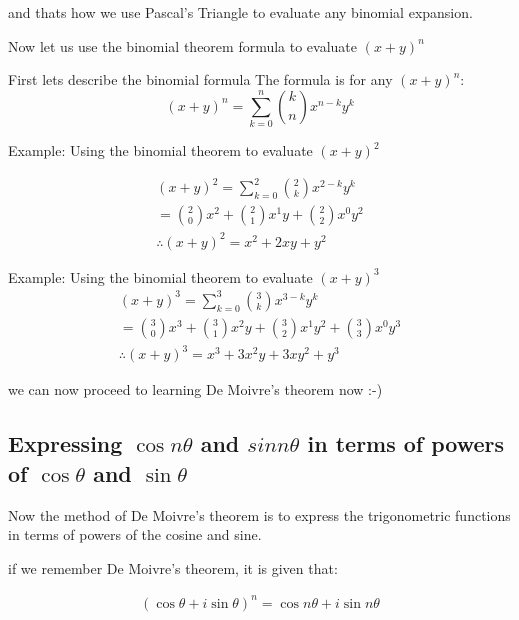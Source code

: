 and thats how we use Pascal's Triangle to evaluate any binomial expansion. \newline

Now let us use the binomial theorem formula to evaluate $(x+y)^n$

First lets describe the binomial formula
The formula is for any $(x+y)^n$:
\begin{equation}
    (x+y)^n = \sum_{k=0}^{n} \binom{k}{n}x^{n-k}y^k
\end{equation}

Example: Using the binomial theorem to evaluate $(x+y)^2$

\begin{equation}
    \begin{split}
        (x+y)^2 = \sum_{k=0}^{2} \binom{2}{k}x^{2-k}y^k \\
        = \binom{2}{0}x^{2} + \binom{2}{1}x^{1}y + \binom{2}{2}x^{0}y^2 \\
        \therefore (x+y)^2 = x^2 + 2xy + y^2
    \end{split}    
\end{equation}

Example: Using the binomial theorem to evaluate $(x+y)^3$
\begin{equation}
    \begin{split}
        (x+y)^3 = \sum_{k=0}^{3} \binom{3}{k}x^{3-k}y^k \\
        = \binom{3}{0}x^{3} + \binom{3}{1}x^{2}y + \binom{3}{2}x^{1}y^2 + \binom{3}{3}x^{0}y^3 \\
        \therefore (x+y)^3 = x^3+3x^2y+3xy^2+y^3
    \end{split}
\end{equation}

we can now proceed to learning De Moivre's theorem now :-)

\subsection{Expressing $\cos{n\theta} $ and $sin{n\theta}$ in terms of powers of $\cos{\theta}$ and $\sin{\theta}$}

Now the method of De Moivre's theorem is to express the trigonometric functions in terms of powers of the cosine and sine.

if we remember De Moivre's theorem, it is given that:

\begin{equation}
    \begin{split}
        (\cos{\theta}+i\sin{\theta})^n = {\cos{n\theta}+i\sin{n\theta}} \\
    \end{split}
\end{equation}


